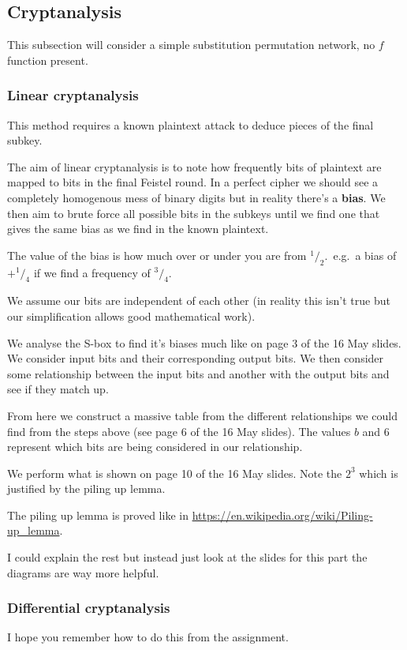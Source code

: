 \documentclass{report}
\begin{document}
\subsection{Cryptanalysis}
This subsection will consider a simple substitution permutation network,
no $f$ function present.

\subsubsection{Linear cryptanalysis}
This method requires a known plaintext attack to deduce pieces of the final
subkey.

The aim of linear cryptanalysis is to note how frequently bits of
plaintext are mapped to bits in the final Feistel round. In a perfect cipher
we should see a completely homogenous mess of binary digits but in reality
there's a \textbf{bias}. We then aim to brute force all possible bits in the
subkeys until we find one that gives the same bias as we find in the known
plaintext.

The value of the bias is how much over or under you are from
${}^1/_2$.\ e.g.\ a bias of $+{}^1/_4$ if we find a frequency of ${}^3/_4$.

We assume our bits are independent of each other (in reality this isn't
true but our simplification allows good mathematical work).

We analyse the S-box to find it's biases much like on page 3 of the 16 May
slides. We consider input bits and their corresponding output bits. We
then consider some relationship between the input bits and another with the
output bits and see if they match up.

From here we construct a massive table from the different relationships we
could find from the steps above (see page 6 of the 16 May slides). The
values $b$ and $6$ represent which bits are being considered in our
relationship.

We perform what is shown on page 10 of the 16 May slides. Note the $2^3$
which is justified by the piling up lemma.

The piling up lemma is proved like in
\url{https://en.wikipedia.org/wiki/Piling-up_lemma}.

I could explain the rest but instead just look at the slides for this part
the diagrams are way more helpful.

\subsubsection{Differential cryptanalysis}
I hope you remember how to do this from the assignment.
\end{document}
